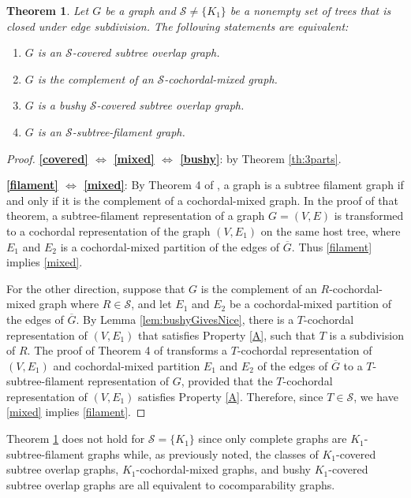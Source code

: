 \documentclass[
final
]{dmtcs-episciences}        \usepackage{graphics, amsthm, amsmath, amssymb, algorithm, algorithmic}
\newtheorem{theorem}{Theorem}
\begin{document}
\begin{theorem}\label{bigThm}
Let $G$ be a graph and $\mathcal{S} \ne \{K_1\}$ be a nonempty set of trees that is closed under edge subdivision. The following statements are equivalent:
\begin{enumerate}
\item $G$ is an $\mathcal{S}$-covered subtree overlap graph. \label{covered}
\item $G$ is the complement of an $\mathcal{S}$-cochordal-mixed graph. \label{mixed}
\item $G$ is a bushy $\mathcal{S}$-covered subtree overlap graph. \label{bushy}
\item $G$ is an $\mathcal{S}$-subtree-filament graph. \label{filament}
\end{enumerate}
\end{theorem}
\begin{proof}

\textbf{\ref{covered} $\Leftrightarrow$ \ref{mixed} $\Leftrightarrow$ \ref{bushy}}: by Theorem \ref{th:3parts}.

\textbf{\ref{filament} $\Leftrightarrow$ \ref{mixed}}: 
By Theorem 4 of \cite{gavril2000}, a graph is a subtree filament graph if and only if it is the complement of a cochordal-mixed graph. 
In the proof of that theorem, a subtree-filament representation of a graph $G=(V,E)$ is transformed to a cochordal representation of the graph $(V,E_1)$ on the same host tree, where $E_1$ and $E_2$ is a cochordal-mixed partition of the edges of $\overline{G}$. Thus \ref{filament} implies \ref{mixed}. 

For the other direction, suppose that $G$ is the complement of an $R$-cochordal-mixed graph where $R \in \mathcal S$, and let $E_1$ and $E_2$ be a cochordal-mixed partition of the edges of $\overline{G}$. By Lemma \ref{lem:bushyGivesNice}, there is a $T$-cochordal representation of $(V,E_1)$ that satisfies Property \ref{A}, such that $T$ is a subdivision of $R$. The proof of Theorem 4 of \cite{gavril2000} transforms a $T$-cochordal representation of $(V,E_1)$ and cochordal-mixed partition $E_1$ and $E_2$ of the edges of $\overline{G}$ to a $T$-subtree-filament representation of $G$, provided that the 
$T$-cochordal representation of $(V,E_1)$ satisfies Property \ref{A}.
Therefore, since $T \in \mathcal S$, we have \ref{mixed} implies \ref{filament}.
\end{proof}

Theorem \ref{bigThm} does not hold for $\mathcal{S} = \{K_1\}$ since only complete graphs are 
$K_1$-subtree-filament graphs while, as previously noted, 
the classes of $K_1$-covered subtree overlap graphs, 
$K_1$-cochordal-mixed graphs, and
bushy $K_1$-covered subtree overlap graphs
are all equivalent to cocomparability graphs.
\end{document}
